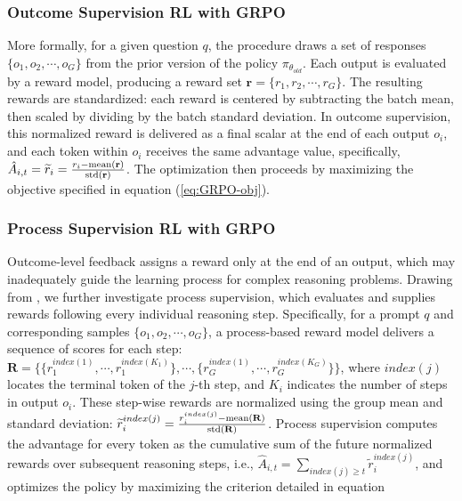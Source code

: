 {\subsubsection{Outcome Supervision RL with GRPO} More formally, for a given question $q$, the procedure draws a set of responses $\{o_1, o_2, \cdots, o_G\}$ from the prior version of the policy $\pi_{\theta_{old}}$. Each output is evaluated by a reward model, producing a reward set $\mathbf{r}=\{r_1, r_2, \cdots, r_G\}$. The resulting rewards are standardized: each reward is centered by subtracting the batch mean, then scaled by dividing by the batch standard deviation. In outcome supervision, this normalized reward is delivered as a final scalar at the end of each output $o_i$, and each token within $o_i$ receives the same advantage value, specifically, $\hat{A}_{i, t} = \widetilde{r}_i = \frac{r_i- {\rm mean}(\mathbf{r})}{{\rm std}(\mathbf{r})}$. The optimization then proceeds by maximizing the objective specified in equation (\ref{eq:GRPO-obj}).

\subsubsection{Process Supervision RL with GRPO} Outcome-level feedback assigns a reward only at the end of an output, which may inadequately guide the learning process for complex reasoning problems. Drawing from \cite{wang2023math}, we further investigate process supervision, which evaluates and supplies rewards following every individual reasoning step. Specifically, for a prompt $q$ and corresponding samples $\{o_1, o_2, \cdots, o_G\}$, a process-based reward model delivers a sequence of scores for each step: $\mathbf{R} = \{ \{r_1^{index(1)},\cdots,r_1^{index(K_1)}\}, \cdots,  \{r_G^{index(1)},\cdots,r_G^{index(K_G)}\} \}$, where $index(j)$ locates the terminal token of the $j$-th step, and $K_i$ indicates the number of steps in output $o_i$. These step-wise rewards are normalized using the group mean and standard deviation: $\widetilde{r}_i^{index(j)} = \frac{r_i^{index(j)} - {\rm mean(\mathbf{R})}}{{\rm std(\mathbf{R})}}$.
Process supervision computes the advantage for every token as the cumulative sum of the future normalized rewards over subsequent reasoning steps, i.e., $\hat{A}_{i, t} = \sum_{index(j) \ge t} \widetilde{r}_i^{index(j)}$,
and optimizes the policy by maximizing the criterion detailed in equation

}
